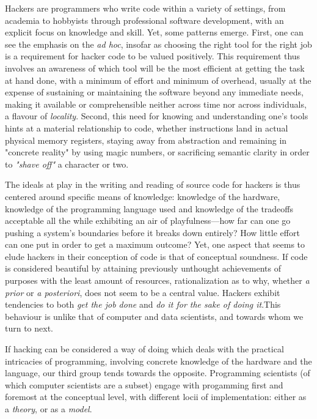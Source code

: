 \vspace{1\baselineskip}

Hackers are programmers who write code within a variety of settings, from academia to hobbyists through professional software development, with an explicit focus on knowledge and skill. Yet, some patterns emerge. First, one can see the emphasis on the \emph{ad hoc}, insofar as choosing the right tool for the right job is a requirement for hacker code to be valued positively. This requirement thus involves an awareness of which tool will be the most efficient at getting the task at hand done, with a minimum of effort and minimum of overhead, usually at the expense of sustaining or maintaining the software beyond any immediate needs, making it available or comprehensible neither across time nor across individuals, a flavour of \emph{locality}. Second, this need for knowing and understanding one's tools hints at a material relationship to code, whether instructions land in actual physical memory registers, staying away from abstraction and remaining in "concrete reality" by using magic numbers, or sacrificing semantic clarity in order to \emph{"shave off"} a character or two.

The ideals at play in the writing and reading of source code for hackers is thus centered around specific means of knowledge: knowledge of the hardware, knowledge of the programming language used and knowledge of the tradeoffs acceptable all the while exhibiting an air of playfulness—how far can one go pushing a system's boundaries before it breaks down entirely? How little effort can one put in order to get a maximum outcome? Yet, one aspect that seems to elude hackers in their conception of code is that of conceptual soundness. If code is considered beautiful by attaining previously unthought achievements of purposes with the least amount of resources, rationalization as to why, whether \emph{a prior} or \emph{a posteriori}, does not seem to be a central value. Hackers exhibit tendencies to both \emph{get the job done} and \emph{do it for the sake of doing it}.This behaviour is unlike that of computer and data scientists, and towards whom we turn to next.

If hacking can be considered a way of doing which deals with the practical intricacies of programming, involving concrete knowledge of the hardware and the language, our third group tends towards the opposite. Programming scientists (of which computer scientists are a subset) engage with progamming first and foremost at the conceptual level, with different locii of implementation: either as a \emph{theory}, or as a \emph{model}.

